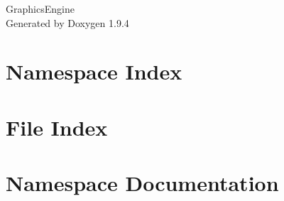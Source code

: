\documentclass[twoside]{book}
\newcommand{\+}{\discretionary{\mbox{\scriptsize$\hookleftarrow$}}{}{}}
\newcommand{\clearemptydoublepage}{%
    \newpage{\pagestyle{empty}\cleardoublepage}%
  }
\begin{document}
  \raggedbottom
  \begin{titlepage}
  \vspace*{7cm}
  \begin{center}%
  {\Large Graphics\+Engine}\\
  \vspace*{1cm}
  {\large Generated by Doxygen 1.9.4}\\
  \end{center}
  \end{titlepage}
  \clearemptydoublepage
  \tableofcontents
  \clearemptydoublepage
\chapter{Namespace Index}

\chapter{File Index}

\chapter{Namespace Documentation}



\end{document}
